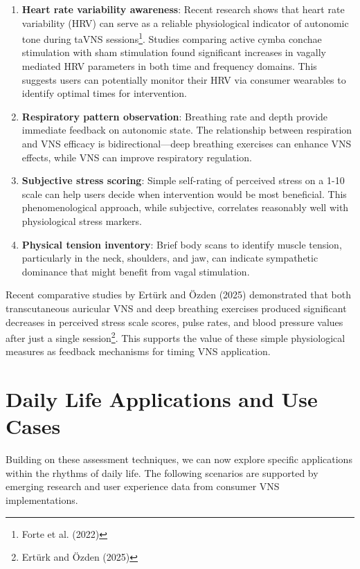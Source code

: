 \documentclass[
  Letterpaper,
]{scrbook}
\begin{document}
\begin{enumerate}
\def\labelenumi{\arabic{enumi}.}
\item
  \textbf{Heart rate variability awareness}: Recent research shows that
  heart rate variability (HRV) can serve as a reliable physiological
  indicator of autonomic tone during taVNS sessions\footnote{Forte et
    al. (2022)}. Studies comparing active cymba conchae stimulation with
  sham stimulation found significant increases in vagally mediated HRV
  parameters in both time and frequency domains. This suggests users can
  potentially monitor their HRV via consumer wearables to identify
  optimal times for intervention.
\item
  \textbf{Respiratory pattern observation}: Breathing rate and depth
  provide immediate feedback on autonomic state. The relationship
  between respiration and VNS efficacy is bidirectional---deep breathing
  exercises can enhance VNS effects, while VNS can improve respiratory
  regulation.
\item
  \textbf{Subjective stress scoring}: Simple self-rating of perceived
  stress on a 1-10 scale can help users decide when intervention would
  be most beneficial. This phenomenological approach, while subjective,
  correlates reasonably well with physiological stress markers.
\item
  \textbf{Physical tension inventory}: Brief body scans to identify
  muscle tension, particularly in the neck, shoulders, and jaw, can
  indicate sympathetic dominance that might benefit from vagal
  stimulation.
\end{enumerate}

Recent comparative studies by Ertürk and Özden (2025) demonstrated that
both transcutaneous auricular VNS and deep breathing exercises produced
significant decreases in perceived stress scale scores, pulse rates, and
blood pressure values after just a single session\footnote{Ertürk and
  Özden (2025)}. This supports the value of these simple physiological
measures as feedback mechanisms for timing VNS application.

\section{Daily Life Applications and Use
Cases}\label{daily-life-applications-and-use-cases}

Building on these assessment techniques, we can now explore specific
applications within the rhythms of daily life. The following scenarios
are supported by emerging research and user experience data from
consumer VNS implementations.
\end{document}
